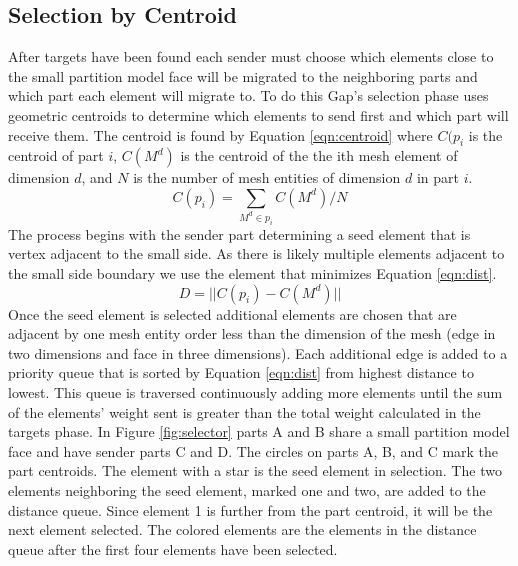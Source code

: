 \documentclass{thesis}
\begin{document}
\subsection{Selection by Centroid}
After targets have been found each sender must choose which elements close 
to the small partition model face will be migrated to the neighboring parts 
and which part each element will migrate to. To do this Gap's selection phase 
uses geometric centroids to determine which elements to send first and which 
part will receive them. The centroid is found by Equation \ref{eqn:centroid} where $C(p_i$ is the centroid of part $i$, $C(M^d)$ is the centroid of the the ith mesh element of dimension $d$, and $N$ is the number of mesh entities of dimension $d$ in part $i$.
\begin{equation}
\label{eqn:centroid}
C(p_i) = \sum_{M^d \in p_i}C(M^d)/N
\end{equation}
The process begins with the sender part determining a seed 
element that is vertex adjacent to the small side. As there is likely 
multiple elements adjacent to the small side boundary we use the element 
that minimizes Equation \ref{eqn:dist}. 
\begin{equation}
\label{eqn:dist}
D = ||C(p_i)-C(M^d)||
\end{equation}
Once the seed element is selected additional elements are chosen that 
are adjacent by one mesh entity order less than the dimension of the mesh 
(edge in two dimensions and face in three dimensions). Each additional edge 
is added to a priority queue that is sorted by Equation \ref{eqn:dist} from 
highest distance to lowest. This queue is traversed continuously adding more 
elements until the sum of the elements' weight sent is greater than the total 
weight calculated in the targets phase. In Figure \ref{fig:selector} parts A 
and B share a small partition model face and have sender parts C and D. The 
circles on parts A, B, and C mark the part centroids. The element with a star 
is the seed element in selection. The two elements neighboring the seed 
element, marked one and two, are added to the distance queue. Since element 
1 is further from the part centroid, it will be the next element selected. 
The colored elements are the elements in the distance queue after the first 
four elements have been selected.
\end{document}
